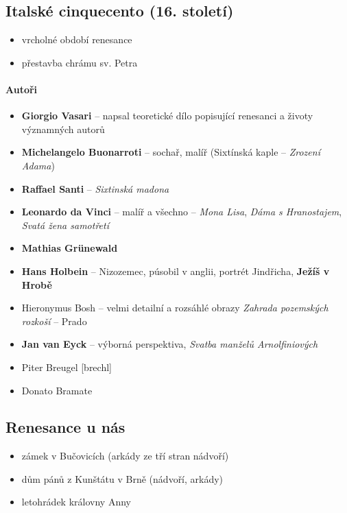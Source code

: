 \subsection{Italské cinquecento (16. století)}
\begin{itemize}
\item vrcholné období renesance
\item přestavba chrámu sv. Petra
\end{itemize}

\paragraph{Autoři}
\begin{itemize}
\item \textbf{Giorgio Vasari} -- napsal teoretické dílo popisující renesanci a životy významných autorů
\item \textbf{Michelangelo Buonarroti} -- sochař, malíř (Sixtínská kaple -- \textit{Zrození Adama})
\item \textbf{Raffael Santi} -- \textit{Sixtinská madona}
\item \textbf{Leonardo da Vinci} -- malíř a všechno -- \textit{Mona Lisa}, \textit{Dáma s Hranostajem}, \textit{Svatá žena samotřetí}
\item \textbf{Mathias Grünewald}
\item \textbf{Hans Holbein} -- Nizozemec, púsobil v anglii, portrét Jindřicha, \textbf{Ježíš v Hrobě}
\item Hieronymus Bosh -- velmi detailní a rozsáhlé obrazy \textit{Zahrada pozemských rozkoší} -- Prado
\item \textbf{Jan van Eyck} -- výborná perspektiva, 	\textit{Svatba manželů Arnolfiniových}
\item Piter Breugel [brechl]
\item Donato Bramate
\end{itemize}

\subsection{Renesance u nás}
\begin{itemize}
\item zámek v Bučovicích (arkády ze tří stran nádvoří)
\item dům pánů z Kunštátu v Brně (nádvoří, arkády)
\item letohrádek královny Anny
\end{itemize}

